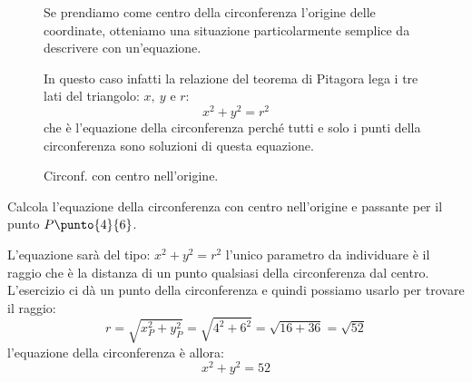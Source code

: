 \begin{figure}[h]
\centering
\begin{minipage}[]{.48\textwidth}

 Se prendiamo come centro della circonferenza l'origine delle coordinate, 
otteniamo una situazione particolarmente semplice da descrivere con 
un'equazione.

In questo caso infatti la relazione del teorema di Pitagora lega i tre lati del 
triangolo: \(x,~y \text{ e } r\):
\[x^2 + y^2 = r^2\]
che è l'equazione della circonferenza perché tutti e solo i punti 
della circonferenza sono soluzioni di questa equazione.
\end{minipage}
\hfill
\begin{minipage}[]{.48\textwidth}
\begin{center}
\begin{inaccessibleblock}
  \circonfO
  \caption{Circonf. con centro nell'origine.} \label{fig:circonfO}
\end{inaccessibleblock}
\end{center}
\end{minipage}
\end{figure}

\begin{esempio}
Calcola l'equazione della circonferenza con centro nell'origine e passante per 
il punto \(P\punto{4}{6}\).

L'equazione sarà del tipo: \(x^2 + y^2 = r^2\) l'unico parametro da individuare 
è il raggio che è la distanza di un punto qualsiasi della circonferenza dal 
centro. L'esercizio ci dà un punto della circonferenza e quindi possiamo usarlo 
per trovare il raggio:
\[r = \sqrt{x_P^2 + y_P^2} = \sqrt{4^2 + 6^2} = \sqrt{16 + 36} = \sqrt{52}\]
l'equazione della circonferenza è allora:
\[x^2 + y^2 = 52\]
\end{esempio}

